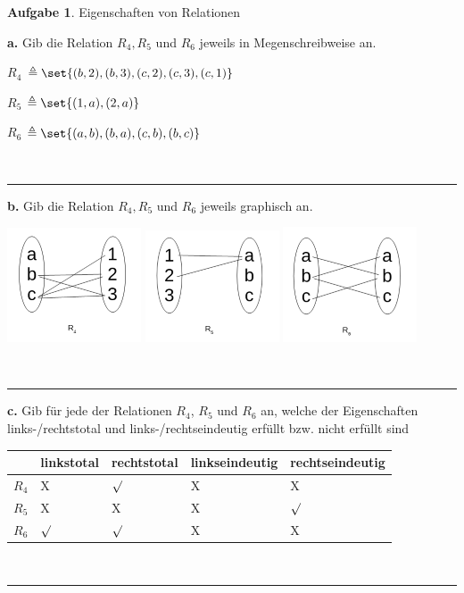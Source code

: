 \documentclass[10pt,leqno ]{article}
\DeclarePairedDelimiter\set\{\}
\theoremstyle{definition}
\newtheorem{problem}[theorem]{Aufgabe}
\newenvironment{solution}[1][L]{\begin{doublespace}\textbf{#1.}\quad }{\ \rule{0.5em}{0.5em}\end{doublespace}}
\begin{document}
\pagebreak

\begin{problem}
    Eigenschaften von Relationen
\end{problem}

\begin{solution}[a]
   Gib die Relation \(R_4, R_5\) und \(R_6\) jeweils in Megenschreibweise an.
   
   $R_4$ \( \triangleq \set{ (b,2),(b,3),(c,2),(c,3),(c,1)} \)
   
   $R_5$ \( \triangleq \set{ (1,a),(2,a)} \)
   
   $R_6$ \( \triangleq \set{(a,b),(b,a),(c,b),(b,c)} \)
   
   
\end{solution}
\begin{solution}[b]
   Gib die Relation \(R_4, R_5\) und \(R_6\) jeweils graphisch an.
   
\includegraphics{abb/R4}
\includegraphics{abb/R5}
\includegraphics{abb/R6}

\end{solution}
\begin{solution}[c]
   Gib für jede der Relationen \(R_4\), \(R_5\) und \(R_6\) an, welche der Eigenschaften links-/rechtstotal
   und links-/rechtseindeutig erfüllt bzw. nicht erfüllt sind
   
   \begin{tabular}{|p{1cm}|p{3cm}|p{3cm}|p{3cm}|p{3cm}|}
     \hline
        & linkstotal & rechtstotal& linkseindeutig& rechtseindeutig\\    
     \hline
       $R_4$  & X &  \(\surd \) & X & X  \\
     \hline
       $R_5$ & X  & X & X&  \(\surd \) \\
     \hline
       $R_6$ & \(\surd \) &  \(\surd \) & X & X \\
     \hline
   \end{tabular}
   
\end{solution}
\end{document}
